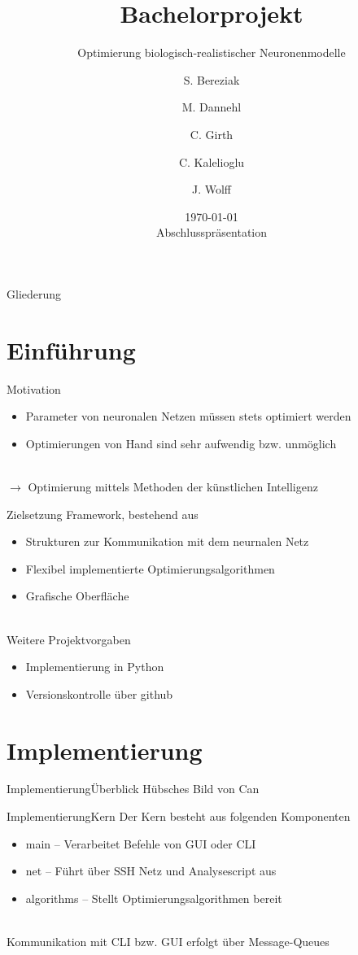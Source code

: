 \documentclass[ngerman,10pt,xcolor=colortbl,compress
]{beamer}
\title{Bachelorprojekt }
\subtitle{Optimierung biologisch-realistischer Neuronenmodelle}
\date[]{\today\\[1ex]Abschlusspräsentation}
\author[Bereziak \and Dannehl \and Girth \and Kalelioglu \and Wolff]{S. Bereziak \and M. Dannehl \and C. Girth \and C. Kalelioglu \and J. Wolff}
\institute[UzL]{Institut für Robotik und kognitive Systeme\\Universität zu Lübeck}
\begin{document}
	\maketitle
	\begin{frame}{Gliederung}
		\tableofcontents
	\end{frame}	
	\section{Einführung}
	\begin{frame}{Motivation}
	\begin{itemize}
	\item Parameter von neuronalen Netzen müssen stets optimiert werden
	\item Optimierungen von Hand sind sehr aufwendig bzw. unmöglich
	\end{itemize}
	\mbox{}\\
	$\rightarrow$ Optimierung mittels Methoden der künstlichen Intelligenz
	\end{frame}
	\begin{frame}{Zielsetzung}
	Framework, bestehend aus
	\begin{itemize}
		\item Strukturen zur Kommunikation mit dem neurnalen Netz
		\item Flexibel implementierte Optimierungsalgorithmen
		\item Grafische Oberfläche
	\end{itemize}
	\mbox{}\\
	Weitere Projektvorgaben
	\begin{itemize}
		\item Implementierung in Python
		\item Versionskontrolle über github
	\end{itemize}
	\end{frame}
	
	\section{Implementierung}
	
	\begin{frame}{Implementierung}{Überblick}
	Hübsches Bild von Can
	\end{frame}
	\begin{frame}{Implementierung}{Kern}
	Der Kern besteht aus folgenden Komponenten
	\begin{itemize}
		\item main -- Verarbeitet Befehle von GUI oder CLI
		\item net -- Führt über SSH Netz und Analysescript aus
		\item algorithms -- Stellt Optimierungsalgorithmen bereit 
	\end{itemize}
	\mbox{}\\
	Kommunikation mit CLI bzw. GUI erfolgt über Message-Queues
	\end{frame}
	
\end{document}
